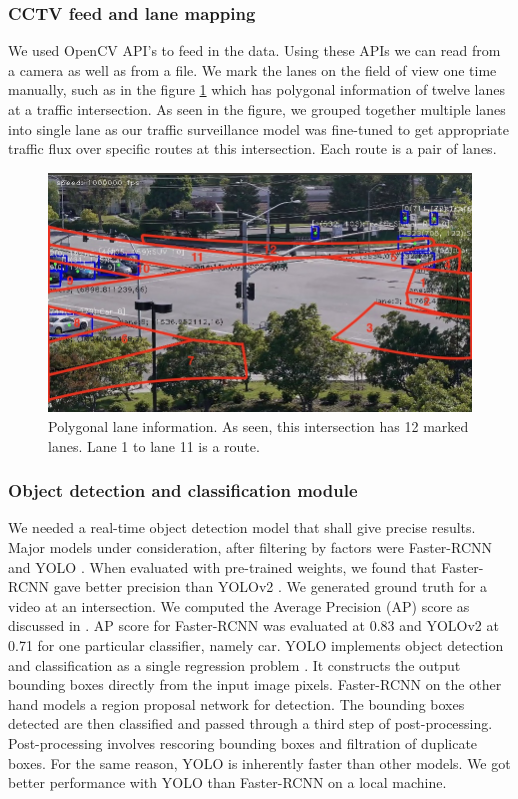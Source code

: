 \documentclass[conference]{IEEEtran}
\newcommand{\figwidthb}{0.80\linewidth}
\begin{document}
\subsubsection{CCTV feed and lane mapping}
We used OpenCV API's to feed in the data. 
Using these APIs we can read from a camera as well as from a file.
We mark the lanes on the field of view one time manually, such as in the figure \ref{fig.lanes_info} which has polygonal information of twelve lanes at a traffic intersection.
As seen in the figure, we grouped together multiple lanes into single lane as our traffic surveillance model was fine-tuned to get appropriate traffic flux over specific routes at this intersection. 
Each route is a pair of lanes.
\begin{figure}[!htbp]
\centering
\includegraphics[scale=0.25]{fig/12_lane_info.png} %
\caption{Polygonal lane information. As seen, this intersection has {12} marked lanes. Lane 1 to lane 11 is a route.} \label{fig.lanes_info}
\end{figure}

\subsubsection{Object detection and classification module}
We needed a real-time object detection model that shall give precise results.
Major models under consideration, after filtering by factors were Faster-RCNN \cite{Faster-RCNN} and YOLO \cite{YOLO_v1, YOLO_v2}.
When evaluated with pre-trained weights, we found that Faster-RCNN gave better precision than YOLOv2 \cite{YOLO_v2}. 
We generated ground truth for a video at an intersection.
We computed the Average Precision ({AP}) score as discussed in \cite{VOC_challenge}.
{AP} score for Faster-RCNN was evaluated at {0.83} and YOLOv2 at {0.71} for one particular classifier, namely car.
YOLO implements object detection and classification as a single regression problem \cite{YOLO_v1}.
It constructs the output bounding boxes directly from the input image pixels. 
Faster-RCNN on the other hand models a region proposal network \cite[p.~1]{Faster-RCNN} for detection.
The bounding boxes detected are then classified and passed through a third step of post-processing. 
Post-processing involves rescoring bounding boxes and filtration of duplicate boxes.
For the same reason, YOLO is inherently faster than other models.
We got better performance with YOLO than Faster-RCNN on a local machine. 
\end{document}
